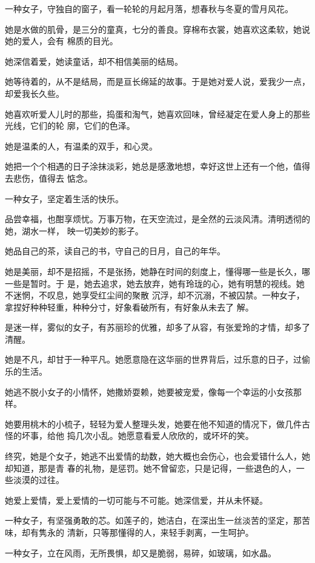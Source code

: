 		一种女子，守独自的窗子，看一轮轮的月起月落，想春秋与冬夏的雪月风花。

		她是水做的肌骨，是三分的童真，七分的善良。穿棉布衣裳，她喜欢这柔软，她说她的爱人，会有
	棉质的目光。


		她深信着爱，她读童话，却不相信美丽的结局。

		她等待着的，从不是结局，而是亘长绵延的故事。于是她对爱人说，爱我少一点，却爱我长久些。

		她喜欢听爱人儿时的那些，捣蛋和淘气，她喜欢回味，曾经凝定在爱人身上的那些光线，它们的轮
	廓，它们的色泽。

		她是温柔的人，有温柔的双手，和心灵。

		她把一个个相遇的日子涂抹淡彩，她总是感激地想，幸好这世上还有一个他，值得去悲伤，值得去
	惦念。


		一种女子，坚定着生活的快乐。

		品尝幸福，也酣享烦忧。万事万物，在天空流过，是全然的云淡风清。清明透彻的她，湖水一样，
	映一切美妙的影子。

		她品自己的茶，读自己的书，守自己的日月，自己的年华。

		她是美丽，却不是招摇，不是张扬，她静在时间的刻度上，懂得哪一些是长久，哪一些是暂时。于
	是，她去追求，她去放弃，她有玲珑的心，她有明慧的视线。她不迷惘，不叹息，她享受红尘间的聚散
	沉浮，却不沉溺，不被囚禁。一种女子，拿捏好种种轻重，种种分寸，好象看破所有，有好象从未去了
	解。

		是迷一样，雾似的女子，有苏丽珍的优雅，却多了从容，有张爱玲的才情，却多了清醒。


		她是不凡，却甘于一种平凡。她愿意隐在这华丽的世界背后，过乐意的日子，过偷乐的生活。

		她逃不脱小女子的小情怀，她撒娇耍赖，她要被宠爱，像每一个幸运的小女孩那样。

		她要用桃木的小梳子，轻轻为爱人整理头发，她要在他不知道的情况下，做几件古怪的坏事，给他
	捣几次小乱。她愿意看爱人欣欣的，或坏坏的笑。

		终究，她是个女子，她逃不出爱情的劫数，她大概也会伤心，也会爱错什么人，她却知道，那是青
	春的礼物，是惩罚。她不曾留恋，只是记得，一些退色的人，一些淡漠的过往。

		她爱上爱情，爱上爱情的一切可能与不可能。她深信爱，并从未怀疑。


		一种女子，有坚强勇敢的芯。如莲子的，她洁白，在深出生一丝淡苦的坚定，那苦味，却有隽永的
	清新，只等那懂得的人，来轻手剥离，一生呵护。

		一种女子，立在风雨，无所畏惧，却又是脆弱，易碎，如玻璃，如水晶。

